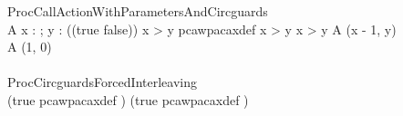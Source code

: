 \begin{circus}
 \circprocess ProcCallActionWithParametersAndCircguards \circdef \circbegin \\
    A \circdef x : \nat ; y : \nat \circspot \lcircguard (\lnot (true \lor false)) \land x > y  \rcircguard \circguard pcawpacaxdef \then \lcircguard x > y \land x > y \rcircguard \circguard A (x - 1, y) \\
    \circspot A (1, 0) \\
 \circend \\

 \circprocess ProcCircguardsForcedInterleaving \circdef \circbegin \\
    \circspot 
      (\lcircguard true \rcircguard \circguard pcawpacaxdef \then \Skip)
      \interleave
      (\lcircguard true \rcircguard \circguard pcawpacaxdef \then \Skip)
      \\
 \circend \\

\end{circus}
